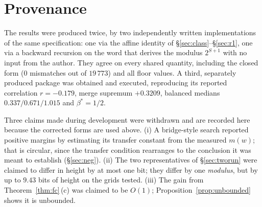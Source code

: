 \documentclass[11pt,a4paper]{article}
\theoremstyle{plain}
\theoremstyle{definition}
\begin{document}
\section*{Provenance}

The results were produced twice, by two independently written implementations
of the same specification: one via the affine identity of
\S\ref{sec:class}--\S\ref{sec:r1}, one via a backward recursion on the word
that derives the modulus $2^{S+1}$ with no input from the author. They agree on
every shared quantity, including the closed form (0 mismatches out of
$19\,773$) and all floor values. A third, separately produced package was
obtained and executed, reproducing its reported correlation $r=-0.179$, merge
supremum $+0.3209$, balanced medians $0.337/0.671/1.015$ and $\beta^{*}=1/2$.

Three claims made during development were withdrawn and are recorded here
because the corrected forms are used above. (i) A bridge-style search reported
positive margins by estimating its transfer constant from the measured
$m(w)$; that is circular, since the transfer condition rearranges to the
conclusion it was meant to establish (\S\ref{sec:neg}). (ii) The two
representatives of \S\ref{sec:tworun} were claimed to differ in height by at
most one bit; they differ by one \emph{modulus}, but by up to $9.43$ bits of
height on the grids tested. (iii) The gain from Theorem~\ref{thm:fc}\,(c) was
claimed to be $O(1)$; Proposition~\ref{prop:unbounded} shows it is unbounded.
\end{document}
